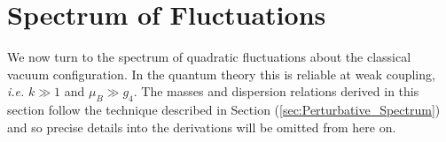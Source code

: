 

\section{Spectrum of Fluctuations}
\label{sec3}
We now turn to the spectrum of quadratic fluctuations about the classical vacuum configuration. In the quantum theory this is reliable at weak coupling, \textit{i.e.} $k\gg 1$ and $\mu_B\gg g_4$. The masses and dispersion relations derived in this section follow the technique described in Section (\ref{sec:Perturbative_Spectrum}) and so precise details into the derivations will be omitted from here on.
